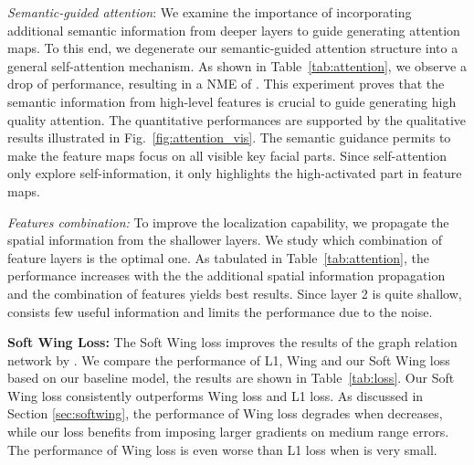 \documentclass[runningheads]{llncs}
\begin{document}
\textit{Semantic-guided attention}:
We examine the importance of incorporating additional semantic information from deeper layers to guide generating attention maps.
To this end, we degenerate our semantic-guided attention structure into a general self-attention mechanism.
As shown in Table~\ref{tab:attention}, we observe a drop of performance, resulting in a NME of .
This experiment proves that the semantic information from high-level features is crucial to guide generating high quality attention.
The quantitative performances are supported by the qualitative results illustrated in Fig.~\ref{fig:attention_vis}.
The semantic guidance permits to make the feature maps focus on all visible key facial parts.
Since self-attention only explore self-information, it only highlights the high-activated part in feature maps.


\textit{Features combination:} 
To improve the localization capability, we propagate the spatial information from the shallower layers.
We study which combination of feature layers is the optimal one.
As tabulated in Table~\ref{tab:attention}, the performance increases with the the additional spatial information propagation and the combination of features  yields best results. 
Since layer 2 is quite shallow,  consists few useful information and limits the performance due to the noise.


\textbf{Soft Wing Loss:} 
The Soft Wing loss improves the results of the graph relation network by .
We compare the performance of L1, Wing and our Soft Wing loss based on our baseline model, the results are shown in Table~\ref{tab:loss}. Our Soft Wing loss consistently outperforms Wing loss and L1 loss. As discussed in Section \ref{sec:softwing}, the performance of Wing loss degrades when  decreases, while our loss benefits from imposing larger gradients on medium range errors. The performance of Wing loss is even worse than L1 loss when  is very small.




\begin{table}[t]
\centering
	\caption{Comparison of different loss functions.
		Analysis shows the effectiveness of Soft Wing loss in terms of the NME (\%).}
	\label{tab:loss}
\end{table}
\end{document}
